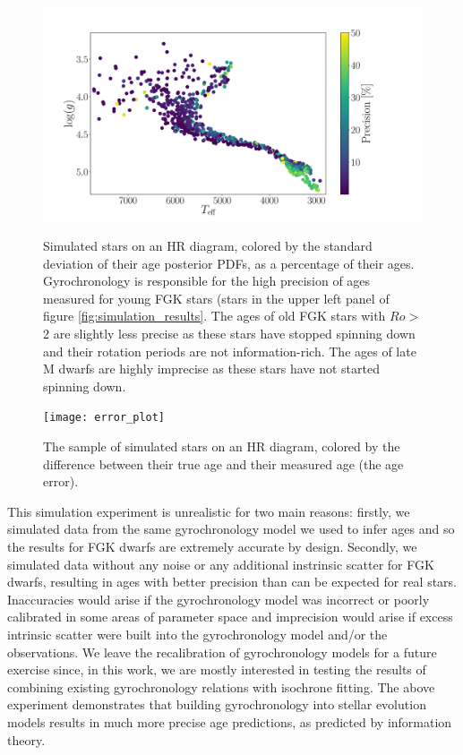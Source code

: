 \begin{figure}
  \caption{
Simulated stars on an HR diagram, colored by the standard deviation of their
    age posterior PDFs, as a percentage of their ages.
Gyrochronology is responsible for the high precision of ages measured for
    young FGK stars (stars in the upper left panel of figure
    \ref{fig:simulation_results}.
The ages of old FGK stars with $Ro > $2 are slightly less precise as these
    stars have stopped spinning down and their rotation periods are not
    information-rich.
The ages of late M dwarfs are highly imprecise as these stars have not started
    spinning down.
}
  \centering
    \includegraphics[width=.7\textwidth]{precision_plot}
\label{fig:precision}
\end{figure}

\begin{figure}
  \caption{
The sample of simulated stars on an HR diagram, colored by the difference
    between their true age and their measured age (the age error).
}
  \centering
    \texttt{[image: error\_plot]}
\label{fig:accuracy}
\end{figure}


This simulation experiment is unrealistic for two main reasons: firstly, we
simulated data from the same gyrochronology model we used to infer ages and so
the results for FGK dwarfs are extremely accurate by design.
Secondly, we simulated data without any noise or any additional instrinsic
scatter for FGK dwarfs, resulting in ages with better precision than can be
expected for real stars.
Inaccuracies would arise if the gyrochronology model was incorrect or poorly
calibrated in some areas of parameter space and imprecision would arise if
excess intrinsic scatter were built into the gyrochronology model and/or the
observations.
We leave the recalibration of gyrochronology models for a future exercise
since, in this work, we are mostly interested in testing the results of
combining existing gyrochronology relations with isochrone fitting.
The above experiment demonstrates that building gyrochronology into stellar
evolution models results in much more precise age predictions, as predicted by
information theory.

